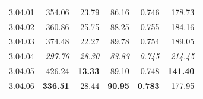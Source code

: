 \begin{table}[ht]
\begin{tabular}{@{}lrrrrr@{}}
    \noalign{\smallskip}
    3.04.01 & 354.06 & 23.79 & 86.16 & 0.746 & 178.73 \\
    3.04.02 & 360.86 & 25.75 & 88.25 & 0.755 & 184.16 \\
    3.04.03 & 374.48 & 22.27 & 89.78 & 0.754 & 189.05 \\
    3.04.04 & \textit{297.76} & \textit{28.30} & \textit{83.83} & \textit{0.745} & \textit{214.45} \\
    3.04.05 & 426.24 & \textbf{13.33} & 89.10 & 0.748 & \textbf{141.40} \\
    3.04.06 & \textbf{336.51} & 28.44 & \textbf{90.95} & \textbf{0.783} & 177.95 \\
\hline
\end{tabular}
\end{table}